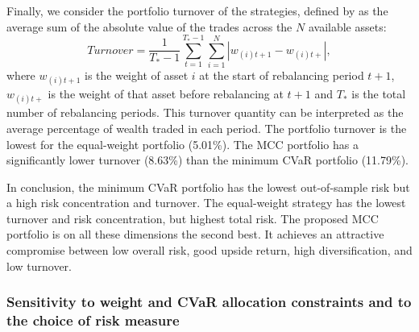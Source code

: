 \documentclass[12pt,a4paper]{article}
\begin{document}

Finally, we consider the portfolio turnover of the strategies, defined by \citet{DeMiguel2009} as the average sum of the absolute value of the trades across the $N$ available assets:
\begin{equation} Turnover = \frac{1}{T_*-1} \sum_{t=1}^{T_*-1} \sum_{i=1}^N | w_{(i)t+1}-w_{(i)t+} |,
\label{eq:turnover} \end{equation}
where $w_{(i)t+1}$ is the weight of asset $i$ at the start of rebalancing period $t+1$, $w_{(i)t+}$ is the weight of that asset before rebalancing at $t+1$ and $T_*$ is the total number of rebalancing periods. This turnover quantity can be interpreted as the average percentage of wealth traded in each period. The portfolio turnover is the lowest for the equal-weight portfolio (5.01\%).  The MCC portfolio has a significantly lower turnover (8.63\%) than the minimum CVaR portfolio (11.79\%).

	In conclusion, the minimum CVaR portfolio has the lowest out-of-sample risk but a high risk concentration and turnover. The equal-weight strategy has the lowest turnover and risk concentration, but highest total risk. The proposed MCC portfolio is on all these dimensions the second best. It achieves an attractive compromise between low overall risk, good upside return, high diversification, and low turnover.

\clearpage

\subsubsection{Sensitivity to weight and CVaR allocation constraints and to the choice of risk measure}
\end{document}
